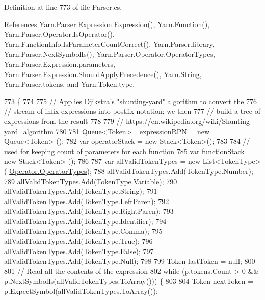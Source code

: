 Definition at line 773 of file Parser.\-cs.



References Yarn.\-Parser.\-Expression.\-Expression(), Yarn.\-Function(), Yarn.\-Parser.\-Operator.\-Is\-Operator(), Yarn.\-Function\-Info.\-Is\-Parameter\-Count\-Correct(), Yarn.\-Parser.\-library, Yarn.\-Parser.\-Next\-Symbol\-Is(), Yarn.\-Parser.\-Operator.\-Operator\-Types, Yarn.\-Parser.\-Expression.\-parameters, Yarn.\-Parser.\-Expression.\-Should\-Apply\-Precedence(), Yarn.\-String, Yarn.\-Parser.\-tokens, and Yarn.\-Token.\-type.


\begin{DoxyCode}
773                                                                          \{
774 
775                 \textcolor{comment}{// Applies Djikstra's "shunting-yard" algorithm to convert the}
776                 \textcolor{comment}{// stream of infix expressions into postfix notation; we then}
777                 \textcolor{comment}{// build a tree of expressions from the result}
778 
779                 \textcolor{comment}{// https://en.wikipedia.org/wiki/Shunting-yard\_algorithm}
780 
781                 Queue<Token> \_expressionRPN = \textcolor{keyword}{new} Queue<Token> ();
782                 var operatorStack = \textcolor{keyword}{new} Stack<Token>();
783 
784                 \textcolor{comment}{// used for keeping count of parameters for each function}
785                 var functionStack = \textcolor{keyword}{new} Stack<Token> ();
786 
787                 var allValidTokenTypes = \textcolor{keyword}{new} List<TokenType>(
      \hyperlink{a00145_ad8a4bb1b46dbc3d1b7708e78a2d97e1c}{Operator.OperatorTypes});
788                 allValidTokenTypes.Add(TokenType.Number);
789                 allValidTokenTypes.Add(TokenType.Variable);
790                 allValidTokenTypes.Add(TokenType.String);
791                 allValidTokenTypes.Add(TokenType.LeftParen);
792                 allValidTokenTypes.Add(TokenType.RightParen);
793                 allValidTokenTypes.Add(TokenType.Identifier);
794                 allValidTokenTypes.Add(TokenType.Comma);
795                 allValidTokenTypes.Add(TokenType.True);
796                 allValidTokenTypes.Add(TokenType.False);
797                 allValidTokenTypes.Add(TokenType.Null);
798 
799                 Token lastToken = null;
800 
801                 \textcolor{comment}{// Read all the contents of the expression}
802                 \textcolor{keywordflow}{while} (p.tokens.Count > 0 && p.NextSymbolIs(allValidTokenTypes.ToArray())) \{
803 
804                     Token nextToken = p.ExpectSymbol(allValidTokenTypes.ToArray());

\end{DoxyCode}
